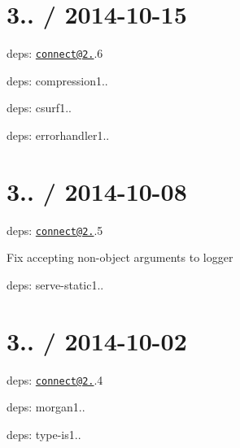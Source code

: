 {\ttfamily \section*{3.. / 2014-\/10-\/15 }}

{\ttfamily }

{\ttfamily 
\begin{DoxyItemize}
\item deps\+: \href{mailto:connect@2.26}{\tt connect@2.}.6
\begin{DoxyItemize}
\item deps\+: compression1..
\item deps\+: csurf1..
\item deps\+: errorhandler1..
\end{DoxyItemize}
\end{DoxyItemize}}

{\ttfamily \section*{3.. / 2014-\/10-\/08 }}

{\ttfamily }

{\ttfamily 
\begin{DoxyItemize}
\item deps\+: \href{mailto:connect@2.26}{\tt connect@2.}.5
\begin{DoxyItemize}
\item Fix accepting non-\/object arguments to {\ttfamily logger}
\item deps\+: serve-\/static1..
\end{DoxyItemize}
\end{DoxyItemize}}

{\ttfamily \section*{3.. / 2014-\/10-\/02 }}

{\ttfamily }

{\ttfamily 
\begin{DoxyItemize}
\item deps\+: \href{mailto:connect@2.26}{\tt connect@2.}.4
\begin{DoxyItemize}
\item deps\+: morgan1..
\item deps\+: type-\/is1..
\end{DoxyItemize}
\end{DoxyItemize}}

